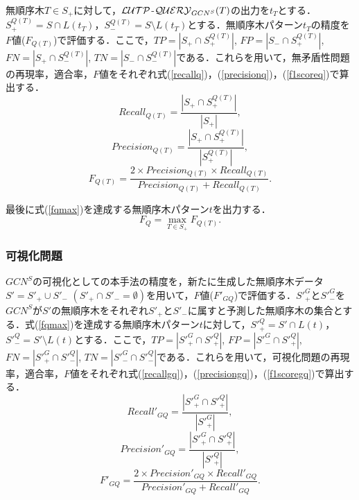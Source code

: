無順序木$T\in S_+$に対して，${\cal LUTP}$-${\cal QUERY}_{GCN^S}(T)$の出力を$t_T$とする．$S_{+}^{Q(T)}=S\cap L(t_T)$，$S_{-}^{Q(T)}=S\setminus L(t_T)$とする．無順序木パターン$t_T$の精度を$F$値($F_{Q(T)}$)で評価する．ここで，$TP=|S_+\cap S_+^{Q(T)}|$, $FP=|S_-\cap S_+^{Q(T)}|$, $FN=|S_+\cap S_-^{Q(T)}|$, $TN=|S_-\cap S_-^{Q(T)}|$である．これらを用いて，無矛盾性問題の再現率，適合率，$F$値をそれぞれ式(\ref{recallq})，(\ref{precisionq})，(\ref{f1scoreq})で算出する．
\begin{equation}
  \label{recallq}
  Recall_{Q(T)}=\frac{|S_+\cap S_{+}^{Q(T)}|}{|S_+|},
\end{equation}
\begin{equation}
  \label{precisionq}
  Precision_{Q(T)}=\frac{|S_+\cap S_{+}^{Q(T)}|}{|S_{+}^{Q(T)}|},
\end{equation}
\begin{equation}
  \label{f1scoreq}
  F_{Q(T)}=\frac{2\times Precision_{Q(T)}\times Recall_{Q(T)}}{Precision_{Q(T)}+Recall_{Q(T)}}.
\end{equation}

\noindent
最後に式(\ref{fqmax})を達成する無順序木パターン$t$を出力する．
\begin{equation}
  \label{fqmax}
  F_Q=\max_{T\in S_+}F_{Q(T)}.
\end{equation}


\subsubsection{可視化問題}\label{subsec4.3.3}
$GCN^S$の可視化としての本手法の精度を，新たに生成した無順序木データ${S'}={S'}_+\cup {S'}_-$ $({S'}_+\cap {S'}_-=\emptyset)$を用いて，$F$値($F'_{GQ}$)で評価する．${S'}_+^G$と${S'}_-^G$を$GCN^S$が$S'$の無順序木をそれぞれ${S'}_+$と${S'}_-$に属すと予測した無順序木の集合とする．式(\ref{fqmax})を達成する無順序木パターン$t$に対して，${S'}_+^Q=S'\cap L(t)$，${S'}_-^Q=S'\setminus L(t)$とする．ここで，$TP=|{S'}_+^{G}\cap {S'}_+^{Q}|$, $FP=|{S'}_-^{G}\cap {S'}_+^{Q}|$, $FN=|{S'}_+^{G}\cap {S'}_-^{Q}|$, $TN=|{S'}_-^{G}\cap {S'}_-^{Q}|$である．これらを用いて，可視化問題の再現率，適合率，$F$値をそれぞれ式(\ref{recallgq})，(\ref{precisiongq})，(\ref{f1scoregq})で算出する．
\begin{equation}
  \label{recallgq}
  Recall'_{GQ}=\frac{|{S'}_+^G\cap {S'}_+^Q|}{|{S'}_+^G|},
\end{equation}
\begin{equation}
  \label{precisiongq}
  Precision'_{GQ}=\frac{|{S'}_+^G\cap {S'}_+^Q|}{|{S'}_+^Q|},
\end{equation}
\begin{equation}
  \label{f1scoregq}
  F'_{GQ}=\frac{2\times Precision'_{GQ}\times Recall'_{GQ}}{Precision'_{GQ}+Recall'_{GQ}}.
\end{equation}


